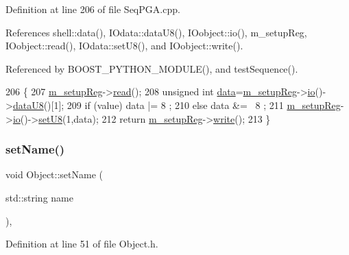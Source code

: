 Definition at line 206 of file Seq\+P\+G\+A.\+cpp.



References shell\+::data(), I\+Odata\+::data\+U8(), I\+Oobject\+::io(), m\+\_\+setup\+Reg, I\+Oobject\+::read(), I\+Odata\+::set\+U8(), and I\+Oobject\+::write().



Referenced by B\+O\+O\+S\+T\+\_\+\+P\+Y\+T\+H\+O\+N\+\_\+\+M\+O\+D\+U\+L\+E(), and test\+Sequence().


\begin{DoxyCode}
206                                            \{
207   \hyperlink{classSeqPGA_a03269241e7fc26493cd0595beda334c2}{m\_setupReg}->\hyperlink{classIOobject_aa07610c11963b1db6710e3c76ceea456}{read}();
208   \textcolor{keywordtype}{unsigned} \textcolor{keywordtype}{int} \hyperlink{namespaceshell_a5ea2525995cedc3efd69ea8a7f034d1e}{data}=\hyperlink{classSeqPGA_a03269241e7fc26493cd0595beda334c2}{m\_setupReg}->\hyperlink{classIOobject_af04fb94137c3d86849f478ac5afab5d1}{io}()->\hyperlink{classIOdata_a75e9c318dbac3a39402179070943d4bc}{dataU8}()[1];
209   \textcolor{keywordflow}{if} (value)  data |=  8 ;
210   \textcolor{keywordflow}{else}        data &= ~8 ;
211   \hyperlink{classSeqPGA_a03269241e7fc26493cd0595beda334c2}{m\_setupReg}->\hyperlink{classIOobject_af04fb94137c3d86849f478ac5afab5d1}{io}()->\hyperlink{classIOdata_a6c4fb2f2af01889ada889c2b7aceb24d}{setU8}(1,data);
212   \textcolor{keywordflow}{return} \hyperlink{classSeqPGA_a03269241e7fc26493cd0595beda334c2}{m\_setupReg}->\hyperlink{classIOobject_a9f6984bc9f0fadcf800f1be2523ac744}{write}();
213 \}
\end{DoxyCode}
\mbox{\label{classObject_ae30fea75683c2d149b6b6d17c09ecd0c}} 
\subsubsection{\texorpdfstring{set\+Name()}{setName()}}
{\footnotesize\ttfamily void Object\+::set\+Name (\begin{DoxyParamCaption}\item[{std\+::string}]{name }\end{DoxyParamCaption})\hspace{0.3cm}{\ttfamily [inline]}, {\ttfamily [inherited]}}



Definition at line 51 of file Object.\+h.



